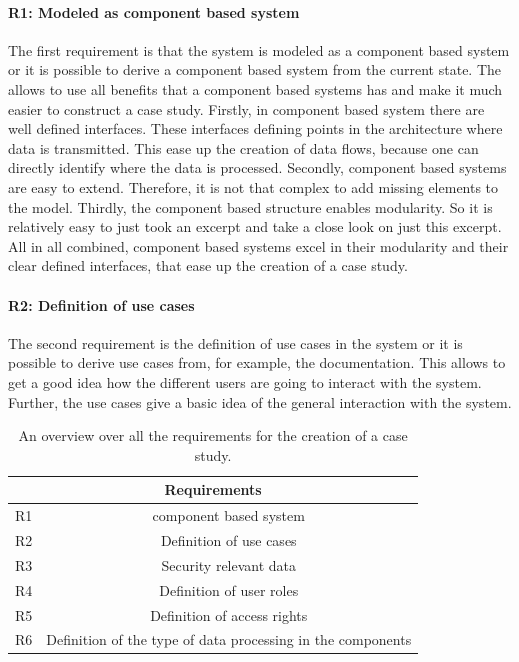 \paragraph{R1: Modeled as component based system}
The first requirement is that the system is modeled as a component based system or it is possible to derive a component based system from the current state. The allows to use all benefits that a component based systems has and make it much easier to construct a case study. Firstly, in component based system there are well defined interfaces. These interfaces defining points in the architecture where data is transmitted. This ease up the creation of data flows, because one can directly identify where the data is processed. Secondly, component based systems are easy to extend. Therefore, it is not that complex to add missing elements to the model. Thirdly, the component based structure enables modularity. So it is relatively easy to just took an excerpt and take a close look on just this excerpt. All in all combined, component based systems excel in their modularity and their clear defined interfaces, that ease up the creation of a case study.
\paragraph{R2: Definition of use cases}
The second requirement is the definition of use cases in the system or it is possible to derive use cases from, for example, the documentation. This allows to get a good idea how the different users are going to interact with the system. Further, the use cases give a basic idea of the general interaction with the system.

\begin{table}
\begin{tabular}{|c|c|}
\hline 
\multicolumn{2}{|c|}{Requirements} \\ 
\hline 
R1 & component based system \\ 
\hline 
R2 & Definition of use cases \\ 
\hline 
R3 & Security relevant data \\ 
\hline 
R4 & Definition of user roles \\ 
\hline 
R5 & Definition of access rights \\ 
\hline 
R6 & Definition of the type of data processing in the components \\
\hline
\end{tabular} 
\label{req_over_sec}
\caption{An overview over all the requirements for the creation of a case study.}
\end{table}
